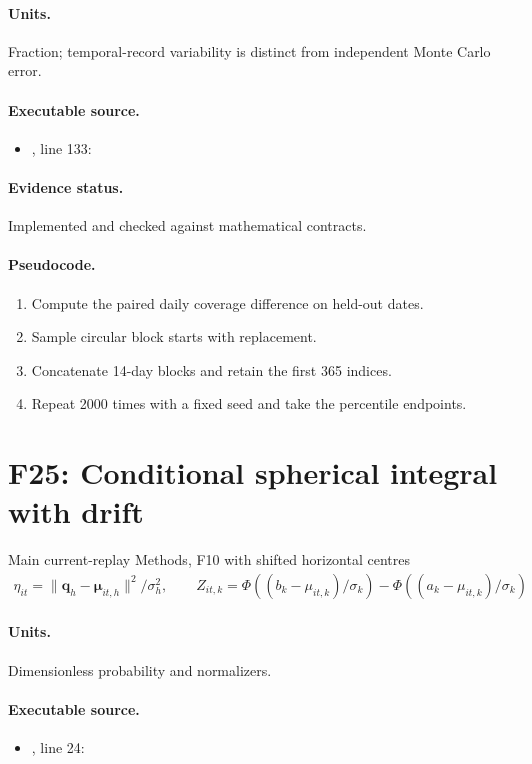 \documentclass[10pt]{article}
\begin{document}
\paragraph{Units.} Fraction; temporal-record variability is distinct from independent Monte Carlo error.
\paragraph{Executable source.}
\begin{itemize}[leftmargin=*]
\item {}, line 133: 
\end{itemize}
\paragraph{Evidence status.} Implemented and checked against mathematical contracts.
\paragraph{Pseudocode.}
\begin{enumerate}[leftmargin=*]
\item Compute the paired daily coverage difference on held-out dates.
\item Sample circular block starts with replacement.
\item Concatenate 14-day blocks and retain the first 365 indices.
\item Repeat 2000 times with a fixed seed and take the percentile endpoints.
\end{enumerate}
\newpage
\section*{F25: Conditional spherical integral with drift}
Main current-replay Methods, F10 with shifted horizontal centres
\begin{gather*}\eta_{it}=\|\mathbf q_h-\boldsymbol\mu_{it,h}\|^2/\sigma_h^2,\qquad Z_{it,k}=\Phi((b_k-\mu_{it,k})/\sigma_k)-\Phi((a_k-\mu_{it,k})/\sigma_k)\end{gather*}
\paragraph{Units.} Dimensionless probability and normalizers.
\paragraph{Executable source.}
\begin{itemize}[leftmargin=*]
\item {}, line 24: 
\end{itemize}
\end{document}
